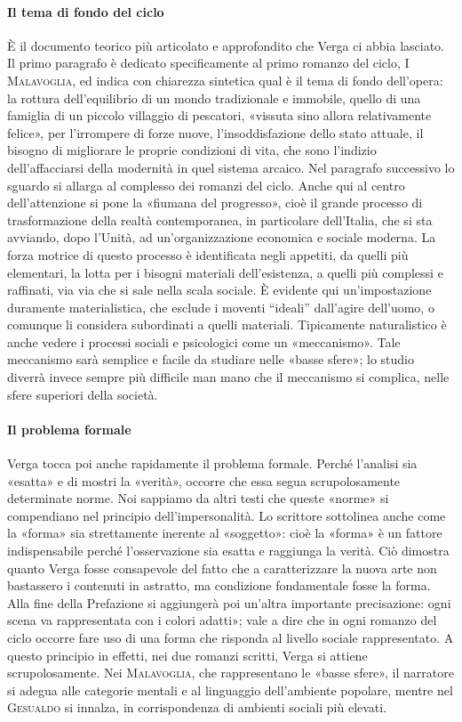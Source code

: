 \documentclass{book}
\begin{document}
\paragraph{Il tema di fondo del ciclo} È il documento teorico più articolato e approfondito che Verga ci abbia lasciato. Il primo paragrafo è dedicato specificamente al primo romanzo del ciclo, \textsc{I Malavoglia}, ed indica con chiarezza sintetica qual è il tema di fondo dell'opera: la rottura dell'equilibrio di un mondo tradizionale e immobile, quello di una famiglia di un piccolo villaggio di pescatori, «vissuta sino allora relativamente felice», per l'irrompere di forze nuove, l'insoddisfazione dello stato attuale, il bisogno di migliorare le proprie condizioni di vita, che sono l'indizio dell'affacciarsi della modernità in quel sistema arcaico. Nel paragrafo successivo lo sguardo si allarga al complesso dei romanzi del ciclo. Anche qui al centro dell'attenzione si pone la «fiumana del progresso», cioè il grande processo di trasformazione della realtà contemporanea, in particolare dell'Italia, che si sta avviando, dopo l'Unità, ad un'organizzazione economica e sociale moderna. La forza motrice di questo processo è identificata negli appetiti, da quelli più elementari, la lotta per i bisogni materiali dell'esistenza, a quelli più complessi e raffinati, via via che si sale nella scala sociale. È evidente qui un'impostazione duramente materialistica, che esclude i moventi “ideali” dall'agire dell'uomo, o comunque li considera subordinati a quelli materiali. Tipicamente naturalistico è anche vedere i processi sociali e psicologici come un «meccanismo». Tale meccanismo sarà semplice e facile da studiare nelle «basse sfere»; lo studio diverrà invece sempre più difficile man mano che il meccanismo si complica, nelle sfere superiori della società.

\paragraph{Il problema formale} Verga tocca poi anche rapidamente il problema formale. Perché l'analisi sia «esatta» e di mostri la «verità», occorre che essa segua scrupolosamente determinate norme. Noi sappiamo da altri testi che queste «norme» si compendiano nel principio dell'impersonalità. Lo scrittore sottolinea anche come la «forma» sia strettamente inerente al «soggetto»: cioè la «forma» è un fattore indispensabile perché l'osservazione sia esatta e raggiunga la verità. Ciò dimostra quanto Verga fosse consapevole del fatto che a caratterizzare la nuova arte non bastassero i contenuti in astratto, ma condizione fondamentale fosse la forma. Alla fine della Prefazione si aggiungerà poi un'altra importante precisazione: ogni scena va rappresentata con i colori adatti»; vale a dire che in ogni romanzo del ciclo occorre fare uso di una forma che risponda al livello sociale rappresentato. A questo principio in effetti, nei due romanzi scritti, Verga si attiene scrupolosamente. Nei \textsc{Malavoglia}, che rappresentano le «basse sfere», il narratore si adegua alle categorie mentali e al linguaggio dell'ambiente popolare, mentre nel \textsc{Gesualdo} si innalza, in corrispondenza di ambienti sociali più elevati.
\end{document}
